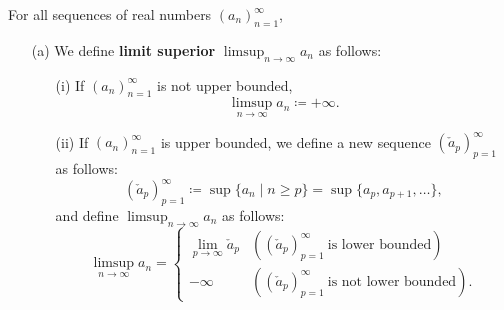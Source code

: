 \begin{frame}[fragile]
  \begin{defi}
    For all sequences of real numbers $(a_n)_{n=1}^\infty$,
    \begin{enumerate}
      \item[(a)] We define {\bf limit superior} $\displaystyle\limsup_{n\to\infty}a_n$ as follows:
      \begin{enumerate}
        \item[(i)] If $(a_n)_{n=1}^\infty$ is not upper bounded,
        \[
          \displaystyle\limsup_{n\to\infty}a_n\coloneqq +\infty.
        \]
        \item[(ii)] If $(a_n)_{n=1}^\infty$ is upper bounded, we define a new sequence $(\check{a}_p)_{p=1}^\infty$ as follows:
        \footnotesize
        \[
          (\check{a}_p)_{p=1}^\infty\coloneqq\sup\{a_n\mid n\geq p\} = \sup\{a_p,a_{p+1},\ldots\},
        \]
        \normalsize
        and define $\displaystyle\limsup_{n\to\infty}a_n$ as follows:
        \footnotesize
        \[
          \displaystyle\limsup_{n\to\infty}a_n = \begin{cases}
            \lim_{p\to\infty}\check{a}_p & ((\check{a}_p)_{p=1}^\infty\ \mbox{is lower bounded})\\
            -\infty & ((\check{a}_p)_{p=1}^\infty\ \mbox{is not lower bounded}).
          \end{cases}
        \]
        \normalsize
      \end{enumerate}
    \end{enumerate}
  \end{defi}
\end{frame}

